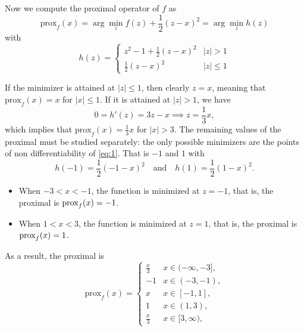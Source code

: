 \documentclass[12pt]{scrartcl}
\begin{document}
Now we compute the proximal operator of $f$ as 
\[
    \mbox{prox}_f(x) = \arg \min_z f(z) + \frac 1 2 (z - x)^2 = \arg \min_z h(z)
\]
with
\begin{equation}\label{eq:1}
h(z) = \begin{cases}
        z^2 - 1 + \frac 1 2 (z - x)^2 & |z| > 1 \\
        \frac 1 2 (z - x)^2 & |z| \leq 1 \end{cases}
\end{equation}


If the minimizer is attained at $|z| \leq 1$, then clearly $z = x$, meaning that $\mbox{prox}_f(x) = x$ for $|x| \leq 1$. If it is attained at $|z| > 1$, we have
\[
    0 = h'(z) = 3z - x \implies z = \frac 1 3 x,  
\]
which implies that $\mbox{prox}_f (x)= \frac 1 3 x$ for $|x| > 3$. The remaining values of the proximal must be studied separately: the only possible minimizers are the points of non differentiability of \eqref{eq:1}. That is $-1$ and $1$ with 
\[
    h(-1) = \frac 1 2 (-1 -x)^2 \quad \text{and} \quad h(1) = \frac 1 2 (1-x)^2.  
\]
\begin{itemize}
    \item When $-3 < x < -1$, the function is minimized at $z = -1$, that is, the proximal is $\hbox{prox}_f(x) = -1$.
    \item When $1 < x < 3$, the function is minimized at $z = 1$, that is, the proximal is $\hbox{prox}_f(x) = 1$.
\end{itemize}
As a result, the proximal is
\[
    \mbox{prox}_f (x) = 
    \begin{cases}
        \frac x 3 & x \in  (-\infty, -3], \\
        -1 & x \in (-3,-1), \\
        x &  x \in [-1, 1],\\
        1 & x \in (1,3), \\
        \frac x 3 & x \in  [3, \infty),
    \end{cases}
\]
\end{document}

